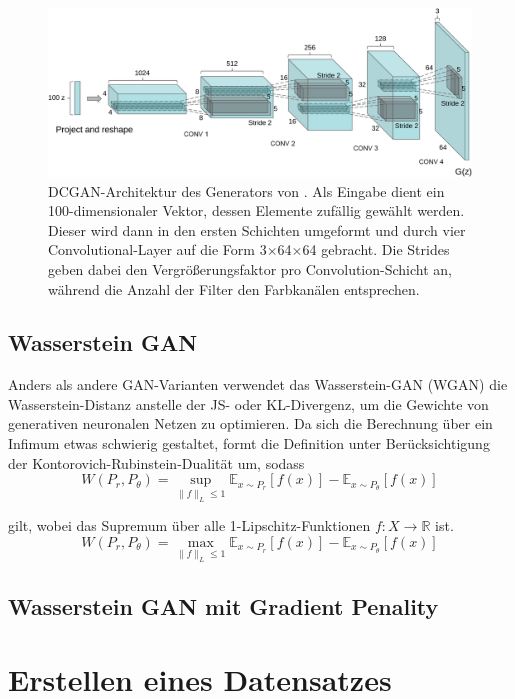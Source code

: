 \documentclass{hsflensburg}
\begin{document}
  \begin{figure}
    \includegraphics[width=\textwidth]{images/dcgan-architecture}
    \caption{DCGAN-Architektur des Generators von
    \cite{radford2016unsupervised}. Als Eingabe dient ein 100-dimensionaler
    Vektor, dessen Elemente zufällig gewählt werden. Dieser wird dann in den
    ersten Schichten umgeformt und durch vier Convolutional-Layer auf die Form
    3$\times$64$\times$64 gebracht. Die Strides geben dabei den
    Vergrößerungsfaktor pro Convolution-Schicht an, während die Anzahl der
    Filter den Farbkanälen entsprechen.}
  \end{figure}

  \section{Wasserstein GAN}
  Anders als andere GAN-Varianten verwendet das Wasserstein-GAN (WGAN) die
  Was\-ser\-stein-Distanz anstelle der JS- oder KL-Divergenz, um die Gewichte von
  generativen neuronalen Netzen zu optimieren. Da sich die Berechnung über ein
  Infimum etwas schwierig gestaltet, formt \cite{arjovsky2017wasserstein} die
  Definition unter Berücksichtigung der Kontorovich-Rubinstein-Dualität um,
  sodass
  \[
    W(P_r, P_\theta) = \sup_{\|f\|_L \leq 1} \mathbb{E}_{x \sim P_r}\left[f(x)\right] - \mathbb{E}_{x \sim P_\theta}\left[f(x)\right]
  \]

  gilt, wobei das Supremum über alle 1-Lipschitz-Funktionen $f : X \to
  \mathbb{R}$ ist.
  \[
    W(P_r, P_\theta) = \max_{\|f\|_L \leq 1} \mathbb{E}_{x \sim P_r}\left[f(x)\right] - \mathbb{E}_{x \sim P_\theta}\left[f(x)\right]
  \]

  \section{Wasserstein GAN mit Gradient Penality}

  \chapter{Erstellen eines Datensatzes}
\end{document}
